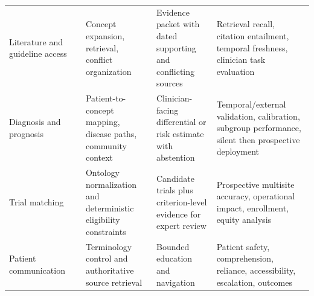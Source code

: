 \begin{table}[!t]
\begin{tabularx}{\textwidth}{@{}L{2.4cm} >{\raggedright\arraybackslash}p{1.5cm} Y Y Y@{}}
Literature and guideline access &  & Concept expansion, retrieval, conflict organization & Evidence packet with dated supporting and conflicting sources & Retrieval recall, citation entailment, temporal freshness, clinician task evaluation \\
Diagnosis and prognosis &  & Patient-to-concept mapping, disease paths, community context & Clinician-facing differential or risk estimate with abstention & Temporal/external validation, calibration, subgroup performance, silent then prospective deployment \\
Trial matching &  & Ontology normalization and deterministic eligibility constraints & Candidate trials plus criterion-level evidence for expert review & Prospective multisite accuracy, operational impact, enrollment, equity analysis \\
Patient communication &  & Terminology control and authoritative source retrieval & Bounded education and navigation & Patient safety, comprehension, reliance, accessibility, escalation, outcomes \\
\bottomrule
\end{tabularx}
\end{table}
